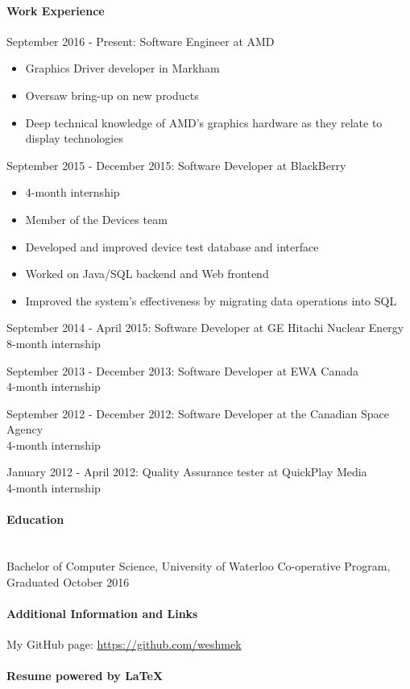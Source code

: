 \documentclass{article}
\begin{document}
\paragraph{Work Experience}
\noindent
\begin{description}
	\item September 2016 - Present: Software Engineer at AMD
	\begin{itemize}
		\item Graphics Driver developer in Markham
		\item Oversaw bring-up on new products
		\item Deep technical knowledge of AMD's graphics hardware as they relate to display technologies
	\end{itemize}
	\item September 2015 - December 2015: Software Developer at BlackBerry
	\begin{itemize}
		\item 4-month internship
		\item Member of the Devices team
		\item Developed and improved device test database and interface
		\item Worked on Java/SQL backend and Web frontend
		\item Improved the system's effectiveness by migrating data operations into SQL
	\end{itemize}
	\item September 2014 - April 2015: Software Developer at GE Hitachi Nuclear Energy~\\
	8-month internship
	\item September 2013 - December 2013: Software Developer at EWA Canada~\\
	4-month internship
	\item September 2012 - December 2012: Software Developer at the Canadian Space Agency~\\
	4-month internship
	\item January 2012 - April 2012: Quality Assurance tester at QuickPlay Media~\\
	4-month internship
\end{description}

\paragraph{Education} ~\\
Bachelor of Computer Science, University of Waterloo Co-operative Program, Graduated October 2016

\paragraph{Additional Information and Links}
\begin{description}
	\item My GitHub page: \url{https://github.com/weshmek}
\end{description}

\paragraph{Resume powered by \LaTeX{}}
\end{document}
